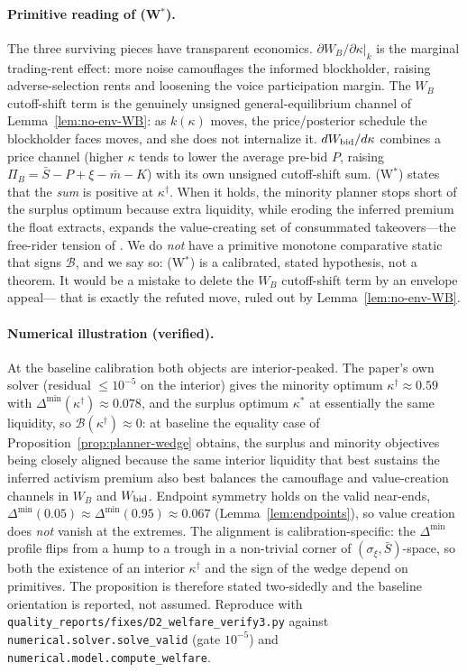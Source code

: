 \paragraph{Primitive reading of (W$^{\ast}$).}
The three surviving pieces have transparent economics.
$\partial W_B/\partial\kappa|_k$ is the marginal trading-rent effect: more noise
camouflages the informed blockholder, raising adverse-selection rents and
loosening the voice participation margin. The $W_B$ cutoff-shift term is the
genuinely unsigned general-equilibrium channel of Lemma~\ref{lem:no-env-WB}: as
$k(\kappa)$ moves, the price/posterior schedule the blockholder faces moves, and
she does not internalize it. $dW_{\textup{bid}}/d\kappa$ combines a price channel
(higher $\kappa$ tends to lower the average pre-bid $P$, raising
$\Pi_B=\bar S-P+\xi-\bar m-K$) with its own unsigned cutoff-shift sum. (W$^{\ast}$)
states that the \emph{sum} is positive at $\kappa^{\dagger}$. When it holds, the
minority planner stops short of the surplus optimum because extra liquidity, while
eroding the inferred premium the float extracts, expands the value-creating set of
consummated takeovers---the free-rider tension of \citet{GrossmanHart1980}. We do
\emph{not} have a primitive monotone comparative static that signs $\mathcal B$,
and we say so: (W$^{\ast}$) is a calibrated, stated hypothesis, not a theorem. It
would be a mistake to delete the $W_B$ cutoff-shift term by an envelope appeal---%
that is exactly the refuted move, ruled out by Lemma~\ref{lem:no-env-WB}.

\paragraph{Numerical illustration (verified).}
At the baseline calibration both objects are interior-peaked. The paper's own
solver (residual $\le10^{-5}$ on the interior) gives the minority optimum
$\kappa^{\dagger}\approx0.59$ with $\Delta^{\min}(\kappa^{\dagger})\approx0.078$,
and the surplus optimum $\kappa^{\ast}$ at essentially the same liquidity, so
$\mathcal B(\kappa^{\dagger})\approx0$: at baseline the equality case of
Proposition~\ref{prop:planner-wedge} obtains, the surplus and minority objectives
being closely aligned because the same interior liquidity that best sustains the
inferred activism premium also best balances the camouflage and value-creation
channels in $W_B$ and $W_{\textup{bid}}$. Endpoint symmetry holds on the valid
near-ends, $\Delta^{\min}(0.05)\approx\Delta^{\min}(0.95)\approx0.067$
(Lemma~\ref{lem:endpoints}), so value creation does \emph{not} vanish at the
extremes.%
The alignment is calibration-specific: the $\Delta^{\min}$ profile flips from a
hump to a trough in a non-trivial corner of $(\sigma_\xi,\bar S)$-space, so both
the existence of an interior $\kappa^{\dagger}$ and the sign of the wedge depend
on primitives. The proposition is therefore stated two-sidedly and the baseline
orientation is reported, not assumed. Reproduce with
\texttt{quality\_reports/fixes/D2\_welfare\_verify3.py} against
\texttt{numerical.solver.solve\_valid} (gate $10^{-5}$) and
\texttt{numerical.model.compute\_welfare}.


